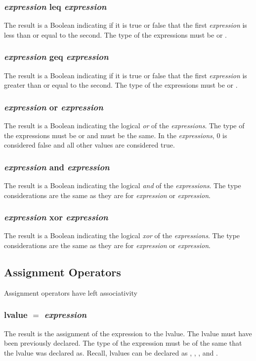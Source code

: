 \subsubsection{\textit{expression} leq \textit{expression}}
The result is a Boolean indicating if it is true or false that the first \textit{expression} is less than  or equal to the second. The type of the expressions must be \integ or \float.%
\subsubsection{\textit{expression} geq \textit{expression}}
The result is a Boolean indicating if it is true or false that the first \textit{expression} is greater than or equal to the second. The type of the expressions must be \integ or \float.%
\subsubsection{\textit{expression} or \textit{expression}}
The result is a Boolean indicating the logical \textit{or} of the \textit{expressions}. The type of the expressions must be \integ or \float and must be the same. In the \textit{expressions}, 0 is considered \textsf{false} and all other values are considered \textsf{true}.
\subsubsection{\textit{expression} and \textit{expression}}
The result is a Boolean indicating the logical \textit{and} of the \textit{expressions}. The type considerations are the same as they are for \textit{expression} or \textit{expression}.
\subsubsection{\textit{expression} xor \textit{expression}}
The result is a Boolean indicating the logical \textit{xor} of the \textit{expressions}. The type considerations are the same as they are for \textit{expression} or \textit{expression}.
\subsection{Assignment Operators}
Assignment operators have left associativity
\subsubsection{lvalue $=$ \textit{expression}}
The result is the assignment of the expression to the lvalue. The lvalue must have been previously declared. The type of the expression must be of the same that the lvalue was declared as. Recall, lvalues can be declared as \integ, \float, \complex, and \mat.
